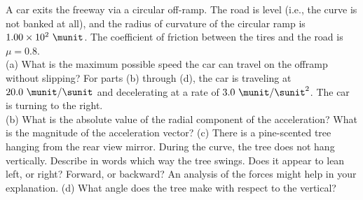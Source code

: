 A car exits the freeway via a circular off-ramp. The road is
level (i.e., the curve is not banked at all), and the
radius of curvature of the circular ramp is $1.00 \times 10^2\ \munit$.
The coefficient of friction between the tires and the road is
$\mu = 0.8$.\\
%
(a) What is the maximum possible speed the car can travel on the
offramp without slipping?\answercheck\hwendpart
%
For parts (b) through (d), the car is traveling at
$20.0\ \munit/\sunit$ and decelerating at a rate of 
$3.0\ \munit/\sunit^2$. The car is turning to the right.\\
%
(b) What is the absolute value of the radial component of the acceleration?
What is the magnitude of the acceleration vector?\answercheck\hwendpart
%
(c) There is a pine-scented tree hanging
from the rear view mirror. During the curve, the tree does not hang vertically.
Describe in
words which way the tree swings. Does it appear to lean left, or right?
Forward, or backward? An analysis of the forces might help in your explanation.\hwendpart
%
(d) What angle does the tree make with respect to the
vertical?\answercheck
